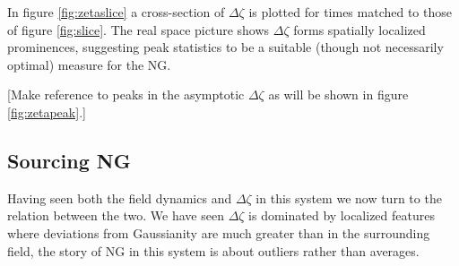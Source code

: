 In figure \ref{fig:zetaslice} a cross-section of $\Delta\zeta$ is plotted for times matched to those of figure \ref{fig:slice}.
The real space picture shows $\Delta\zeta$ forms spatially localized prominences, suggesting peak statistics to be a suitable (though not necessarily optimal) measure for the NG.

[Make reference to peaks in the asymptotic $\Delta\zeta$ as will be shown in figure \ref{fig:zetapeak}.]

\Fzetadiff
\Fzetaslice
\Fzetapeak


\subsection{Sourcing NG} \label{sec:zeta production}




Having seen both the field dynamics and $\Delta\zeta$ in this system we now turn to the relation between the two.
We have seen $\Delta\zeta$ is dominated by localized features where deviations from Gaussianity are much greater than in the surrounding field, the story of NG in this system is about outliers rather than averages.


